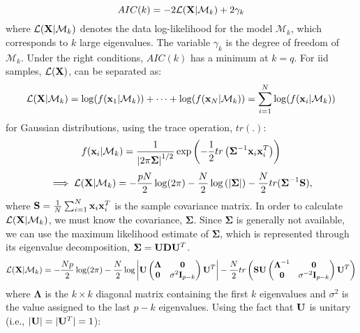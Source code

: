 \documentclass[10pt,technote,peerreview]{IEEEtran}
\newcommand{\bSigma}{\boldsymbol{\Sigma}}
\newcommand{\mM}{\mathcal{M}}
\newcommand{\mL}{\mathcal{L}}
\begin{document}
\begin{equation}
AIC(k) = -2\mL({\bf X}|\mM_k) + 2\gamma_k
\end{equation}
where $\mL({\bf X}|\mM_k)$ denotes the data log-likelihood for the model $\mM_k$, which corresponds to $k$ large eigenvalues. The variable $\gamma_k$ is the degree of freedom of $\mM_k$. Under the right conditions, $AIC(k)$ has a minimum at $k=q$. For iid samples, $\mL({\bf X})$, can be separated as: 
\begin{equation}
\mL({\bf X}|\mM_k) = \log(f({\bf x}_1|\mM_k))+\dots+\log(f({\bf x}_N|\mM_k)) = \sum_{i=1}^{N}\log(f({\bf x}_i|\mM_k))
\end{equation}
for Gaussian distributions, using the trace operation, $tr(.)$:
\begin{equation}
f({\bf x}_i|\mM_k) = \frac{1}{\left|2\pi\bSigma\right|^{1/2}}\exp\left(-\frac{1}{2}tr\left(\bSigma^{-1}{\bf x}_i{\bf x}_i^T\right)\right)
\end{equation}
\begin{equation}
\implies \mL({\bf X}|\mM_k) = -\frac{pN}{2}\log(2\pi) -\frac{N}{2}\log\left(\left|\bSigma\right|\right) - \frac{N}{2}tr(\bSigma^{-1}{\bf S}),
\end{equation}
where ${\bf S}=\frac{1}{N}\sum_{i=1}^{N}{\bf x}_i{\bf x}_i^T$ is the sample covariance matrix. 
In order to calculate $\mL({\bf X}|\mM_k)$, we must know the covariance, $\bSigma$. Since $\bSigma$ is generally not available, we can use the maximum likelihood estimate of $\bSigma$, which is represented through its eigenvalue decomposition, $\bSigma = {\bf U}{\bf D}{\bf U}^T$. 
\begin{equation}
\mL({\bf X}|\mM_k) = -\frac{Np}{2}\log(2\pi) - \frac{N}{2}\log
\left|
{\bf U}
\begin{pmatrix}
\boldsymbol{\Lambda} & {\bf 0}\\
{\bf 0}				 & \sigma^2\textbf{I}_{p-k}\\
\end{pmatrix}
{\bf U}^T\right|
-\frac{N}{2}tr\left({\bf S}
{\bf U}
\begin{pmatrix}
\boldsymbol{\Lambda}^{-1} & {\bf 0}\\
{\bf 0}				 & \sigma^{-2}\textbf{I}_{p-k}\\
\end{pmatrix}
{\bf U}^T\right)
\end{equation}
where $\boldsymbol{\Lambda}$ is the $k\times k$ diagonal matrix containing the first $k$ eigenvalues and $\sigma^2$ is the value assigned to the last $p-k$ eigenvalues. Using the fact that ${\bf U}$ is unitary (i.e., $|{\bf U}|=|{\bf U}^T|=1$):
\end{document}
